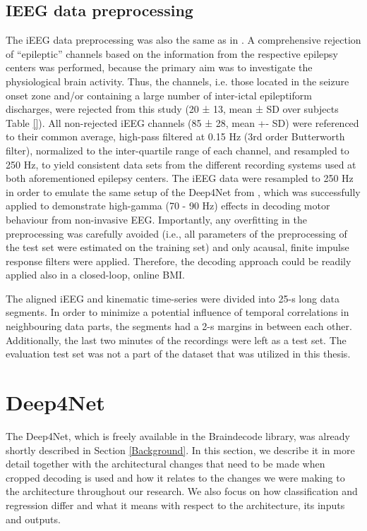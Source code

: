 \subsection{IEEG data preprocessing}\label{subsec:ieeg-data-preprocessing}
The iEEG data preprocessing was also the same as in \cite{hammer_2021}. A comprehensive rejection of “epileptic” channels based on the information from the respective epilepsy centers was performed, because the primary aim was to investigate the physiological brain activity. Thus, the channels, i.e. those located in the seizure onset zone and/or containing a large number of inter-ictal epileptiform discharges, were rejected from this study (20 ± 13, mean ± SD over subjects Table \ref{}). All non-rejected iEEG channels (85 ± 28, mean +- SD) were referenced to their common average, high-pass filtered at 0.15 Hz (3rd order Butterworth filter), normalized to the inter-quartile range of each channel, and resampled to 250 Hz, to yield consistent data sets from the different recording systems used at both aforementioned epilepsy centers. The iEEG data were resampled to 250 Hz in order to emulate the same setup of the Deep4Net from \cite{Schirrmeister_2017}, which was successfully applied to demonstrate high-gamma (70 - 90 Hz) effects in decoding motor behaviour from non-invasive EEG. Importantly, any overfitting in the preprocessing was carefully avoided (i.e., all parameters of the preprocessing of the test set were estimated on the training set) and only acausal, finite impulse response filters were applied. Therefore, the decoding approach could be readily applied also in a closed-loop, online BMI.

The aligned iEEG and kinematic time-series were divided into 25-s long data segments. In order to minimize a potential influence of temporal correlations in neighbouring data parts, the segments had a 2-s margins in between each other. Additionally, the last two minutes of the recordings were left as a test set. The evaluation test set was not a part of the dataset that was utilized in this thesis.

\section{Deep4Net}\label{sec:deep4net}
The Deep4Net, which is freely available in the Braindecode library, was already shortly described in Section \ref{Background}. 
In this section, we describe it in more detail together with the architectural changes that need to be made when cropped decoding is used and how it relates to the changes we were making to the architecture throughout our research. 
We also focus on how classification and regression differ and what it means with respect to the architecture, its inputs and outputs. 

